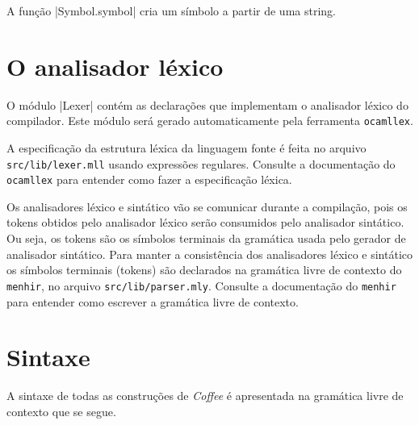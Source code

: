 \documentclass[a4paper,11pt,brazil]{article}
\newcommand{\lang}{\textsl{Coffee}}
\begin{document}
A função \pyginline|Symbol.symbol| cria um símbolo a partir de uma
string.


\section{O  analisador léxico}

O módulo \pyginline|Lexer| contém as declarações que implementam o
analisador léxico do compilador. Este módulo será gerado
automaticamente pela ferramenta \texttt{ocamllex}.

A especificação da estrutura léxica da linguagem fonte é feita no
arquivo \texttt{src/lib/lexer.mll} usando expressões
regulares. Consulte a documentação do \texttt{ocamllex} para entender
como fazer a especificação léxica.

Os analisadores léxico e sintático vão se comunicar durante a
compilação, pois os tokens obtidos pelo analisador léxico serão
consumidos pelo analisador sintático. Ou seja, os tokens são os
símbolos terminais da gramática usada pelo gerador de analisador
sintático. Para manter a consistência dos analisadores léxico e
sintático os símbolos terminais (tokens) são declarados na gramática
livre de contexto do \texttt{menhir}, no arquivo
\texttt{src/lib/parser.mly}. Consulte a documentação do
\texttt{menhir} para entender como escrever a gramática livre de
contexto.




\section{Sintaxe}


A sintaxe de todas as construções de \lang{} é apresentada na
gramática livre de contexto que se segue.
\end{document}
